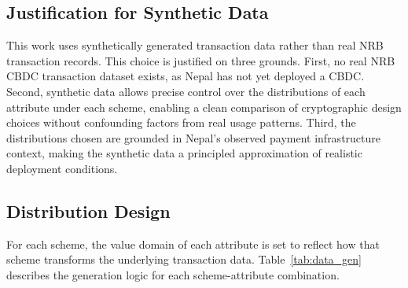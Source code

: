 \subsection{Justification for Synthetic Data}

This work uses synthetically generated transaction data
rather than real NRB transaction records. This choice is
justified on three grounds. First, no real NRB CBDC
transaction dataset exists, as Nepal has not yet deployed
a CBDC. Second, synthetic data allows precise control over
the distributions of each attribute under each scheme,
enabling a clean comparison of cryptographic design choices
without confounding factors from real usage patterns.
Third, the distributions chosen are grounded in Nepal's
observed payment infrastructure context, making the
synthetic data a principled approximation of realistic
deployment conditions.

\subsection{Distribution Design}

For each scheme, the value domain of each attribute is
set to reflect how that scheme transforms the underlying
transaction data. Table~\ref{tab:data_gen} describes the
generation logic for each scheme-attribute combination.

